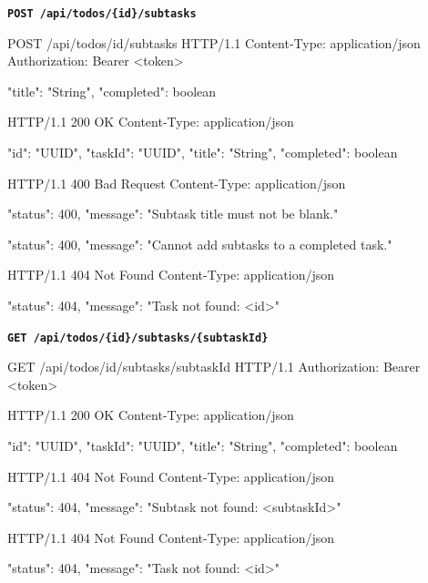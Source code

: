 \newpage



\textbf{\texttt{POST /api/todos/\{id\}/subtasks}}

\begin{httpexchange}
\begin{httplisting}
POST /api/todos/{id}/subtasks HTTP/1.1
Content-Type: application/json
Authorization: Bearer <token>

{
    "title": "String",
    "completed": boolean
}
\end{httplisting}
\httpmidarrows
\begin{httplisting}
HTTP/1.1 200 OK
Content-Type: application/json

{
    "id": "UUID",
    "taskId": "UUID",
    "title": "String",
    "completed": boolean
}

HTTP/1.1 400 Bad Request
Content-Type: application/json

{
    "status": 400,
    "message": "Subtask title must not be blank."
}

{
    "status": 400,
    "message": "Cannot add subtasks to a completed task."
}

HTTP/1.1 404 Not Found
Content-Type: application/json

{
    "status": 404,
    "message": "Task not found: <id>"
}
\end{httplisting}
\end{httpexchange}


\textbf{\texttt{GET /api/todos/\{id\}/subtasks/\{subtaskId\}}}

\begin{httpexchange}
\begin{httplisting}
GET /api/todos/{id}/subtasks/{subtaskId} HTTP/1.1
Authorization: Bearer <token>
\end{httplisting}
\httpmidarrows
\begin{httplisting}
HTTP/1.1 200 OK
Content-Type: application/json

{
    "id": "UUID",
    "taskId": "UUID",
    "title": "String",
    "completed": boolean
}

HTTP/1.1 404 Not Found
Content-Type: application/json

{
    "status": 404,
    "message": "Subtask not found: <subtaskId>"
}

HTTP/1.1 404 Not Found
Content-Type: application/json

{
    "status": 404,
    "message": "Task not found: <id>"
}
\end{httplisting}
\end{httpexchange}


